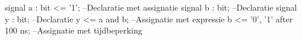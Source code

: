 signal a : bit <= '1';       --Declaratie met assignatie
signal b : bit;              --Declaratie
signal y : bit;              --Declaratie
y <= a and b;                --Assignatie met expressie
b <= '0', '1' after 100 ns;  --Assignatie met tijdbeperking
